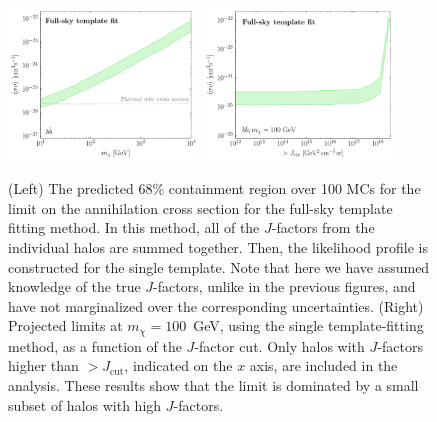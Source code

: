 \begin{figure}[t]
   \centering
   \includegraphics[width=0.45\textwidth]{ch-darksky/plots//TFAllLimitstruth.pdf}
     \includegraphics[width=0.45\textwidth]{ch-darksky/plots//TFLimitsJcut.pdf}
   \caption{ (Left)  The predicted 68\% containment region over 100 MCs for the limit on the annihilation cross section for the full-sky template fitting method.  In this method, all of the $J$-factors from the individual halos are summed together.  Then, the likelihood profile is constructed for the single template.  Note that here we have assumed knowledge of the true $J$-factors, unlike in the previous figures, and have not marginalized over the corresponding uncertainties.
   (Right)  Projected limits at $m_\chi = 100$~GeV, using the single template-fitting method, as a function of the $J$-factor cut.  Only halos with $J$-factors higher than $> J_\text{cut}$, indicated on the $x$ axis, are included in the analysis.  These results show that the limit is dominated by a small subset of halos with high $J$-factors.
   }
   \label{fig:DarkSkyallhalossensitivity}
\end{figure}

